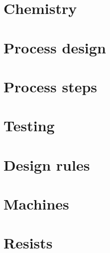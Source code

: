 \documentclass[10pt,a4paper,oneside]{article}
\newcounter{ct}
\begin{document}
\section{Chemistry}


\newpage
\section{Process design}

\newpage




\newpage

\newpage

\newpage

\newpage

\newpage

\newpage

\newpage
\section{Process steps}
\label{process_overview}
\newpage

\newpage

\newpage

\newpage

\newpage

\newpage

\newpage

\newpage

\newpage

\newpage

\newpage

\newpage
\section{Testing}

\newpage

\newpage

\newpage
\section{Design rules}


\newpage
\def\MachinePictureWidth{4cm}
\def\MachinePictureMiniPageWidth{5cm}
\def\MachineTextMiniPageWidth{12cm}
\newcommand{\tabitem}{~~\llap{\textbullet}~~}
\section{Machines}





\newpage



\newpage


\newpage
\section{Resists}


\newpage
\listoffootnotes \cleardoublepage
\end{document}

